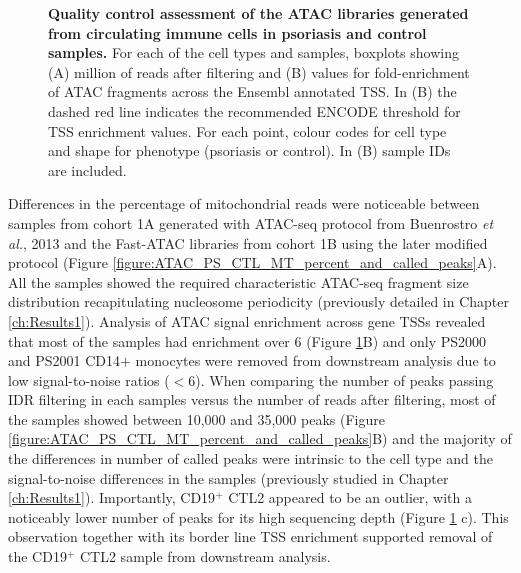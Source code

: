 \begin{figure}[htbp]
\begin{subfigure}{0.5\textwidth}
\caption{\textbf{}}
\end{subfigure}
\caption[Quality control assessment of the ATAC libraries generated from circulating immune cells in psoriasis and control samples.]{\textbf{Quality control assessment of the ATAC libraries generated from circulating immune cells in psoriasis and control samples.} For each of the cell types and samples, boxplots showing (A) million of reads after filtering and (B) values for fold-enrichment of ATAC fragments across the Ensembl annotated TSS. In (B) the dashed red line indicates the recommended ENCODE threshold for TSS enrichment values. For each point, colour codes for cell type and shape for phenotype (psoriasis or control). In (B) sample IDs are included.}
\label{figure:ATAC_PS_CTL_QC}
\end{figure} 


Differences in the percentage of mitochondrial reads were noticeable between samples from cohort 1A generated with ATAC-seq protocol from Buenrostro \textit{et al.}, 2013 and the Fast-ATAC libraries from cohort 1B using the later modified \parencite{Corces2016} protocol (Figure \ref{figure:ATAC_PS_CTL_MT_percent_and_called_peaks}A). All the samples showed the required characteristic ATAC-seq fragment size distribution recapitulating nucleosome periodicity (previously detailed in Chapter \ref{ch:Results1}). Analysis of ATAC signal enrichment across gene TSSs revealed that most of the samples had enrichment over 6 (Figure \ref{figure:ATAC_PS_CTL_QC}B) and only PS2000 and PS2001 CD14$+$ monocytes were removed from downstream analysis due to low signal-to-noise ratios ($<$6). When comparing the number of peaks passing IDR filtering in each samples versus the number of reads after filtering, most of the samples showed between 10,000 and 35,000 peaks (Figure \ref{figure:ATAC_PS_CTL_MT_percent_and_called_peaks}B) and the majority of the differences in number of called peaks were intrinsic to the cell type and the signal-to-noise differences in the samples (previously studied in Chapter \ref{ch:Results1}). %
Importantly, CD19$^+$ CTL2 appeared to be an outlier, with a noticeably lower number of peaks for its high sequencing depth (Figure \ref{figure:ATAC_PS_CTL_QC} c). This observation together with its border line TSS enrichment supported removal of the CD19$^+$ CTL2 sample from downstream analysis.


